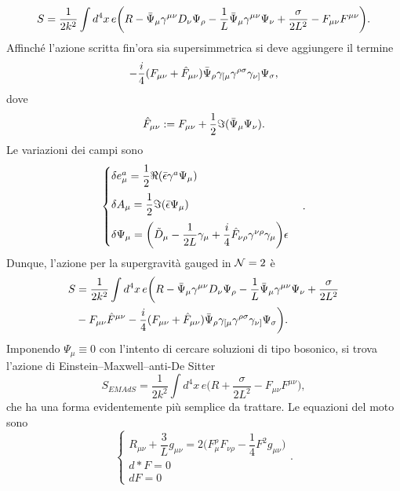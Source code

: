 \begin{equation}
    S = \frac{1}{2k^2}\int d^4x\,e\bigg(R - \bar{\Psi}_\mu\gamma^{\mu\nu}D_\nu\Psi_\rho - \frac{1}{L}\bar{\Psi}_\mu\gamma^{\mu\nu}\Psi_\nu + \frac{\sigma}{2L^2} - F_{\mu\nu}F^{\mu\nu}\bigg).
\end{equation}
Affinché l'azione scritta fin'ora sia supersimmetrica si deve aggiungere il termine 
\begin{equation}
    -\frac{i}{4}(F_{\mu\nu} + \hat{F}_{\mu\nu})\bar{\Psi}_\rho\gamma_{[\mu}\gamma^{\rho\sigma}\gamma_{\nu]}\Psi_\sigma,
\end{equation}
dove 
\begin{equation}
    \hat{F}_{\mu\nu} := F_{\mu\nu} + \frac{1}{2}\Im{(\bar{\Psi}_\mu\Psi_\nu)}.
\end{equation}
Le variazioni dei campi sono 
\begin{equation}
    \begin{cases}
        \delta e_\mu^a = \dfrac{1}{2}\Re{(\bar{\epsilon}\gamma^a\Psi_\mu)} \\[2ex]
        \delta A_\mu = \dfrac{1}{2}\Im{(\bar{\epsilon}\Psi_\mu)} \\[2ex]
        \delta \Psi_\mu = \bigg(\tilde{D}_\mu - \dfrac{1}{2L}\gamma_\mu + \dfrac{i}{4}\hat{F}_{\nu\rho}\gamma^{\nu\rho}\gamma_\mu\bigg)\epsilon
    \end{cases}.
\end{equation}
Dunque, l'azione per la supergravità gauged in $\mathcal{N} = 2$ è
\begin{equation}
    \begin{split}
        S &= \frac{1}{2k^2}\int d^4x\,e\bigg(R - \bar{\Psi}_\mu\gamma^{\mu\nu}D_\nu\Psi_\rho - \frac{1}{L}\bar{\Psi}_\mu\gamma^{\mu\nu}\Psi_\nu + \frac{\sigma}{2L^2} \\
        &- F_{\mu\nu}\hat{F}^{\mu\nu} -\frac{i}{4}(F_{\mu\nu} + \hat{F}_{\mu\nu})\bar{\Psi}_\rho\gamma_{[\mu}\gamma^{\rho\sigma}\gamma_{\nu]}\Psi_\sigma\bigg).
    \end{split}
\end{equation}
Imponendo $\Psi_\mu \equiv 0$ con l'intento di cercare soluzioni di tipo bosonico, si trova l'azione di Einstein--Maxwell--anti-De Sitter
\begin{equation}
    S_{EMAdS} = \frac{1}{2k^2}\int d^4x\,e\bigg(R + \frac{\sigma}{2L^2} - F_{\mu\nu}F^{\mu\nu}\bigg),
\end{equation}
che ha una forma evidentemente più semplice da trattare. Le equazioni del moto sono 
\begin{equation}
    \begin{cases}
        R_{\mu\nu} + \dfrac{3}{L}g_{\mu\nu} = 2\bigg(F^\rho_\mu F_{\nu\rho} - \dfrac{1}{4}F^2g_{\mu\nu}\bigg) \\
        d*F = 0 \\
        dF = 0
    \end{cases}.
\end{equation}
